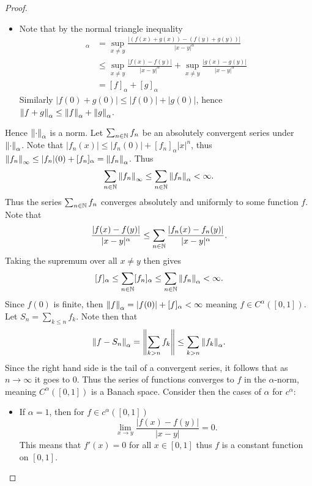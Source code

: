 \documentclass[hw_all.tex]{subfiles}
\begin{document}
\begin{proof}
\begin{itemize}
        \item 
            Note that by the normal triangle inequality
            \begin{align*}
                [f + g]_{\alpha} &= \sup_{x \neq y} \frac{|(f(x) + g(x)) - (f(y) + g(y))|}{|x-y|^{\alpha}} \\
                                 &\leq \sup_{x \neq y} \frac{|f(x) - f(y)|}{|x-y|^{\alpha}} + \sup_{x \neq y} \frac{|g(x) - g(y)|}{|x - y|^{\alpha}} \\
                                 &= [f]_{\alpha} + [g]_{\alpha}
            \end{align*}
            Similarly $|f(0) + g(0)| \leq |f(0)| + |g(0)|$, hence $\norm{f + g}_{\alpha} \leq \norm{f}_{\alpha} + \norm{g}_{\alpha}$.
    \end{itemize}
    Hence $\norm{\cdot}_{\alpha}$ is a norm. Let $\sum_{n \in \mathbb{N}} f_n$ be an absolutely convergent series under $\norm{\cdot}_{\alpha}$. Note that $|f_n(x)| \leq |f_n(0)| + [f_n]_{\alpha} |x|^n$, thus $\norm{f_n}_{\infty} \leq |f_n|(0) + [f_n]_{\alpha} = \norm{f_n}_{\alpha}$. Thus
    \[
        \sum_{n\in \mathbb{N}} \norm{f_n}_{\infty} \leq \sum_{n\in \mathbb{N}} \norm{f_n}_{\alpha} < \infty
    .\]
    Thus the series $\sum_{n \in \mathbb{N}} f_n$ converges absolutely and uniformly to some function $f$. Note that
    \[
        \frac{|f(x) - f(y)|}{|x-y|^\alpha} \leq \sum_{n \in \mathbb{N}} \frac{|f_n(x) - f_n(y)|}{|x-y|^\alpha}
    .\]
    Taking the supremum over all $x \neq y$ then gives
    \[
        [f]_{\alpha} \leq \sum_{n \in \mathbb{N}} [f_n]_{\alpha} \leq \sum_{n \in \mathbb{N}} \norm{f_n}_{\alpha} < \infty
    .\]
    Since $f(0)$ is finite, then $\norm{f}_{\alpha} = |f(0)| + [f]_{\alpha} < \infty$ meaning $f \in C^{\alpha}([0,1])$. Let $S_n = \sum_{k \leq n} f_k$. Note then that
    \[
        \norm{f - S_n}_{\alpha} = \norm{\sum_{k > n} f_k} \leq \sum_{k > n} \norm{f_k}_{\alpha}
    .\]
    Since the right hand side is the tail of a convergent series, it follows that as $n \to \infty$ it goes to $0$. Thus the series of functions converges to $f$ in the $\alpha$-norm, meaning $C^\alpha([0,1])$ is a Banach space. Consider then the cases of $\alpha$ for $c^\alpha$:
    \begin{itemize}
        \item[$\alpha = 1)$]
            If $\alpha = 1$, then for $f \in c^\alpha([0,1])$
            \[
                \lim_{x \to y} \frac{|f(x) - f(y)|}{|x - y|} = 0
            .\]
            This means that $f'(x) = 0$ for all $x \in [0,1]$ thus $f$ is a constant function on $[0,1]$.


\end{itemize}
\end{proof}
\end{document}
